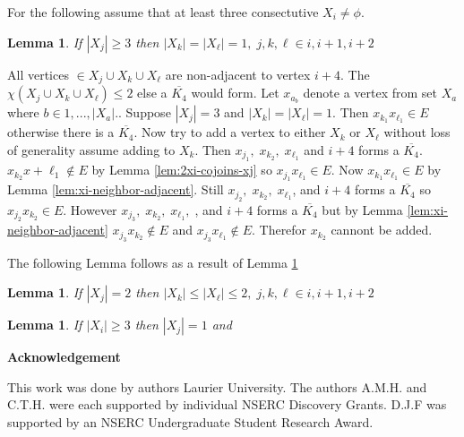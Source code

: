 \documentclass[12pt]{article}
\newtheorem{Lemma}[Theorem]{Lemma}
\begin{document}
For the following assume that at least three consectutive $X_i \neq \phi$.
\begin{Lemma}\label{lem:three-consecutive-xi}
If $|X_j| \geq 3$ then $|X_k| = |X_\ell| = 1,\; j,k,\ell \in {i,i+1,i+2}$
\end{Lemma}
 All vertices $\in X_j \cup X_k \cup X_\ell$ are non-adjacent to vertex $i+4$. The $\chi(X_j \cup X_k \cup X_\ell) \leq 2$ else a $\overline{K_4}$ would form. Let $x_a_b$ denote a vertex from set $X_a$ where $b \in {1,..., |X_a|}.$. Suppose $|X_j| = 3$ and $|X_k| = |X_\ell| = 1$.  Then $x_k_1x_\ell_1 \in E$ otherwise there is a $\overline{K_4}$. Now try to add a vertex to either $X_k$ or $X_\ell$ without loss of generality assume adding to $X_k$. Then $x_j_1,\;x_k_2,\;x_\ell_1$ and $i+4$ forms a $\overline{K_4}$. $x_k_2x+\ell_1 \not \in E$ by Lemma \ref{lem:2xi-cojoins-xj}  so $x_j_1x_\ell_1 \in E$. Now $x_k_1x_\ell_1 \in E$ by Lemma \ref{lem:xi-neighbor-adjacent}. Still $x_j_2,\;x_k_2,\;x_\ell_1$, and $i+4$ forms a $\overline{K_4}$ so $x_j_2x_k_2 \in E$. However $x_j_3,\;x_k_2,\;x_\ell_1,\;$, and $i+4$ forms a $\overline{K_4}$ but by Lemma \ref{lem:xi-neighbor-adjacent} $x_j_3x_k_2 \not \in E$ and $x_j_3x_\ell_1 \not \in E$. Therefor $x_k_2$ cannont be added.

The following Lemma follows as a result of Lemma \ref{lem:three-consecutive-xi}
\begin{Lemma}\label{lem:f-three-consecutive-xi}
If $|X_j| = 2$ then $|X_k| \leq |X_\ell| \leq 2,\; j,k,\ell \in {i,i+1,i+2}$
\end{Lemma}






\begin{Lemma}\label{lem:xi-xi2-xi3-clique}
If $|X_i| \geq 3$ then $|X_j| = 1$ and 
\end{Lemma}

\begin{center}
{\bf Acknowledgement}
\end{center}
This work was done by authors  Laurier University. The authors A.M.H. and C.T.H. were each supported by individual NSERC Discovery Grants. D.J.F was supported by an NSERC Undergraduate Student Research Award.


\clearpage
\begin{thebibliography}{99}

\end{thebibliography}
\end{document}
